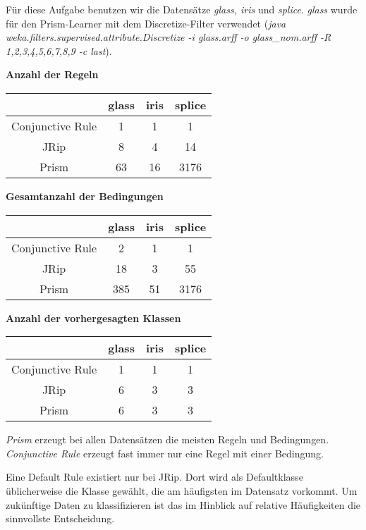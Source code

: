 
F\"ur diese Aufgabe benutzen wir die Datens\"atze \emph{glass, iris} und \emph{splice}.
\emph{glass} wurde f\"ur den Prism-Learner mit dem Discretize-Filter verwendet (\emph{java weka.filters.supervised.attribute.Discretize -i glass.arff -o glass\_nom.arff -R 1,2,3,4,5,6,7,8,9 -c last}).

\textbf{Anzahl der Regeln}
\begin{table}[htb]
	\centering
\begin{tabular}{c|c|c|c}
	             & glass & iris & splice \\ \hline
Conjunctive Rule &   1   &  1   &   1    \\ \hline
JRip             &   8   &  4   &   14   \\ \hline
Prism	         &   63  &  16   &  3176    \\
\end{tabular}
\end{table}


\textbf{Gesamtanzahl der Bedingungen}
\begin{table}[htb]
	\centering
\begin{tabular}{c|c|c|c}
	             & glass & iris & splice \\ \hline
Conjunctive Rule &   2   &  1   &   1    \\ \hline
JRip             &  18   &  3   &   55   \\ \hline
Prism	         &  385  & 51   &   3176   \\
\end{tabular}
\end{table}


\textbf{Anzahl der vorhergesagten Klassen}
\begin{table}[htb]
	\centering
\begin{tabular}{c|c|c|c}
	             & glass & iris & splice \\ \hline
Conjunctive Rule &   1   &  1   &   1    \\ \hline
JRip             &   6   &  3   &   3    \\ \hline
Prism	         &   6   &  3   &   3    \\
\end{tabular}
\end{table}

\emph{Prism} erzeugt bei allen Datens\"atzen die meisten Regeln und Bedingungen. \emph{Conjunctive Rule} erzeugt fast immer nur eine Regel mit einer Bedingung.

Eine Default Rule existiert nur bei JRip. Dort wird als Defaultklasse \"ublicherweise die Klasse gew\"ahlt, die am h\"aufigsten im Datensatz vorkommt. Um zukünftige Daten zu klassifizieren ist das im Hinblick auf relative Häufigkeiten die sinnvollste Entscheidung.

